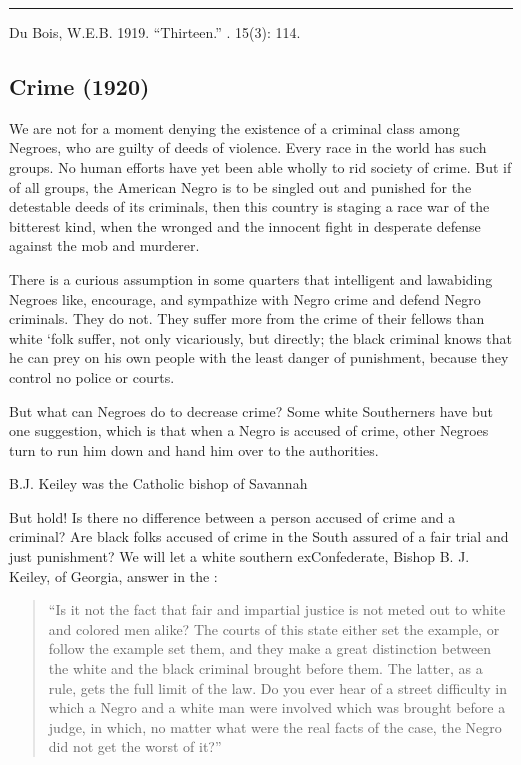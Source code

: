 \documentclass[letterpaper,10pt,english]{jupyterBook}
\begin{document}
\bigskip\hrule\bigskip


\sphinxAtStartPar
{} Du Bois, W.E.B. 1919. “Thirteen.” . 15(3): 114.


\subsection{Crime (1920)}
\label{\detokenize{Volumes/19/04/crime:crime-1920}}\label{\detokenize{Volumes/19/04/crime::doc}}
\sphinxAtStartPar
We are not for a moment denying the existence of a criminal class among Negroes, who are guilty of deeds of violence. Every race in the world has such groups. No human efforts have yet been able wholly to rid society of crime. But if of all groups, the American Negro is to be singled out and punished  for the detestable deeds of its criminals, then this country is staging a race war of the bitterest kind, when the wronged and the innocent fight in desperate defense against the mob and murderer.

\sphinxAtStartPar
There is a curious assumption in some quarters that intelligent and law\sphinxhyphen{}abiding Negroes like, encourage, and sympathize with Negro crime and defend Negro criminals. They do not. They suffer more from the crime of their fellows than white ‘folk suffer, not only vicariously, but directly; the black criminal knows that he can prey on his own people with the least danger of punishment, because they control no police or courts.

\sphinxAtStartPar
But what can Negroes do to decrease crime? Some white Southerners have but one suggestion, which is that when a Negro is accused of crime, other Negroes turn to run him down and hand him over to the authorities.

\begin{sphinxShadowBox}
\sphinxstylesidebartitle{}

\sphinxAtStartPar
B.J. Keiley was the Catholic bishop of Savannah
\end{sphinxShadowBox}

\sphinxAtStartPar
But hold! Is there no difference between a person accused of crime and a criminal? Are black folks accused of crime in the South assured of a fair trial and just punishment? We will let a white southern ex\sphinxhyphen{}Confederate, Bishop B. J. Keiley, of Georgia, answer in the :
\begin{quote}

\sphinxAtStartPar
“Is it not the fact that fair and impartial justice is not meted out to white and colored men alike? The courts of this state either set the example, or follow the example set them, and they make a great distinction between the white and the black criminal brought before them. The latter, as a rule, gets the full limit of the law. Do you ever hear of a street difficulty in which a Negro and a white man were involved which was brought before a judge, in which, no matter what were the real facts of the case, the Negro did not get the worst of it?”
\end{quote}
\end{document}
